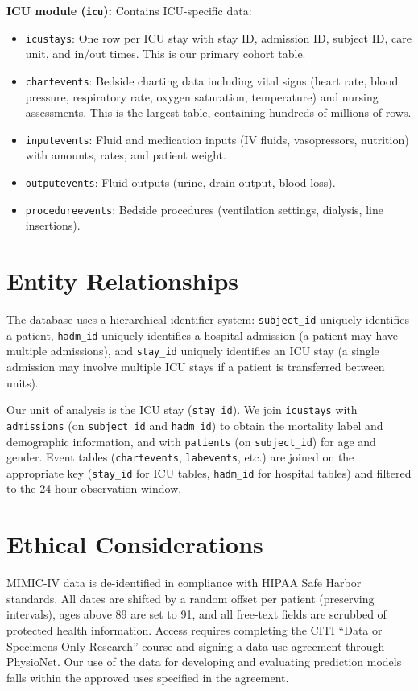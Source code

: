 \documentclass[11pt,a4paper]{report}
\begin{document}
\textbf{ICU module (\texttt{icu}):} Contains ICU-specific data:
\begin{itemize}[leftmargin=2em]
\item \texttt{icustays}: One row per ICU stay with stay ID, admission ID, subject ID, care unit, and in/out times. This is our primary cohort table.
\item \texttt{chartevents}: Bedside charting data including vital signs (heart rate, blood pressure, respiratory rate, oxygen saturation, temperature) and nursing assessments. This is the largest table, containing hundreds of millions of rows.
\item \texttt{inputevents}: Fluid and medication inputs (IV fluids, vasopressors, nutrition) with amounts, rates, and patient weight.
\item \texttt{outputevents}: Fluid outputs (urine, drain output, blood loss).
\item \texttt{procedureevents}: Bedside procedures (ventilation settings, dialysis, line insertions).
\end{itemize}

\section{Entity Relationships}

The database uses a hierarchical identifier system: \texttt{subject\_id} uniquely identifies a patient, \texttt{hadm\_id} uniquely identifies a hospital admission (a patient may have multiple admissions), and \texttt{stay\_id} uniquely identifies an ICU stay (a single admission may involve multiple ICU stays if a patient is transferred between units).

Our unit of analysis is the ICU stay (\texttt{stay\_id}). We join \texttt{icustays} with \texttt{admissions} (on \texttt{subject\_id} and \texttt{hadm\_id}) to obtain the mortality label and demographic information, and with \texttt{patients} (on \texttt{subject\_id}) for age and gender. Event tables (\texttt{chartevents}, \texttt{labevents}, etc.) are joined on the appropriate key (\texttt{stay\_id} for ICU tables, \texttt{hadm\_id} for hospital tables) and filtered to the 24-hour observation window.

\section{Ethical Considerations}

MIMIC-IV data is de-identified in compliance with HIPAA Safe Harbor standards. All dates are shifted by a random offset per patient (preserving intervals), ages above 89 are set to 91, and all free-text fields are scrubbed of protected health information. Access requires completing the CITI ``Data or Specimens Only Research'' course and signing a data use agreement through PhysioNet. Our use of the data for developing and evaluating prediction models falls within the approved uses specified in the agreement.
\end{document}

